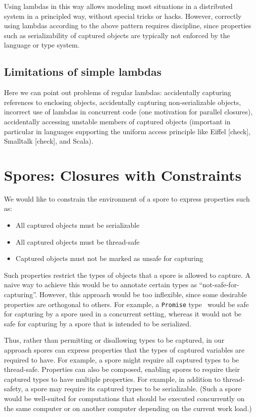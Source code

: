\documentclass{llncs}
\begin{document}
Using lambdas in this way allows modeling most situations 
in a distributed system in a principled way, without special tricks or
hacks. However, correctly using lambdas according to the above pattern
requires discipline, since properties such as serializability of captured
objects are typically not enforced by the language or type system.

\subsection{Limitations of simple lambdas}

Here we can point out problems of regular lambdas: accidentally capturing
references to enclosing objects, accidentally capturing non-serializable
objects, incorrect use of lambdas in concurrent code (one motivation for
parallel closures), accidentally accessing unstable members of captured
objects (important in particular in languages supporting the uniform access
principle like Eiffel [check], Smalltalk [check], and Scala).


\section{Spores: Closures with Constraints}

We would like to constrain the environment of a spore to express properties
such as:
\begin{itemize}
\item All captured objects must be serializable
\item All captured objects must be thread-safe
\item Captured objects must not be marked as unsafe for capturing
\end{itemize}
\noindent
Such properties restrict the types of objects that a spore is allowed to
capture. A naive way to achieve this would be to annotate certain types as
``not-safe-for-capturing''. However, this approach would be too inflexible,
since some desirable properties are orthogonal to others. For example, a
\verb|Promise| type~\cite{promise-paper} would be safe for capturing by a
spore used in a concurrent setting, whereas it would not be safe for capturing
by a spore that is intended to be serialized.

Thus, rather than permitting or disallowing types to be captured, in our
approach spores can express properties that the types of captured variables
are required to have. For example, a spore might require all captured types to
be thread-safe. Properties can also be composed, enabling spores to require
their captured types to have multiple properties. For example, in addition to
thread-safety, a spore may require its captured types to be serializable.
(Such a spore would be well-suited for computations that should be executed
concurrently on the same computer or on another computer depending on the
current work load.)
\end{document}
